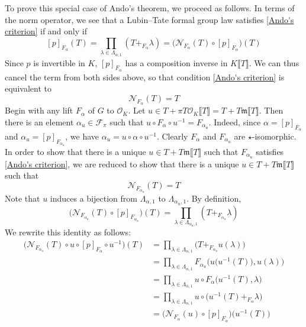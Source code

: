 \documentclass[12pt]{article}
\theoremstyle{definition}
\newcommand{\PS}[1]{\llbracket #1 \rrbracket}
\def\TF{\mathscr{F}}
\def\CN{\mathscr{N}}
\def\m{\mathfrak{m}}
\def\O{\mathcal{O}}
\begin{document}
    To prove this special case of Ando's theorem, we proceed as follows. In terms of the norm operator, we see that a Lubin--Tate formal group law satisfies \eqref{Ando's criterion} if and only if 
    \begin{equation} \label{Ando's condition in term of CN before canceling [p]_F}
        [p]_{F_\alpha}(T) = \prod_{\lambda \in \Lambda_{\alpha,1}} (T +_{F_\alpha} \lambda) = \bigl(\CN_{F_\alpha}(T) \circ [p]_{F_\alpha}\bigr)(T)
    \end{equation} 
    Since $p$ is invertible in $K$, $[p]_{F_\alpha}$ has a composition inverse in $K\PS{T}$. We can thus cancel the term from both sides above, so that condition \eqref{Ando's criterion} is equivalent to 
    \begin{equation} \label{Walker's conclusion}
        \CN_{F_\alpha}(T) = T
    \end{equation}
    Begin with any lift $F_\alpha$ of $G$ to $\O_K$. Let $u \in T + \pi T \O_K\PS{T} = T + T\m\PS{T}$. Then there is an element $\alpha_u \in \TF_\pi$ such that $u \circ F_\alpha \circ u^{-1} = F_{\alpha_u}$. Indeed, since $\alpha = [p]_{F_\alpha}$ and $\alpha_u = [p]_{F_{\alpha_u}}$, we have $\alpha_u = u \circ \alpha \circ u^{-1}$. Clearly $F_\alpha$ and $F_{\alpha_u}$ are $\star$-isomorphic. In order to show that there is a unique $u \in T + T\m\PS{T}$ such that $F_{\alpha_u}$ satisfies \eqref{Ando's criterion}, we are reduced to show that there is a unique $u \in T + T\m\PS{T}$ such that 
    \begin{equation} \label{condition for CN_F_alpha_u}
        \CN_{F_{\alpha_u}}(T) = T
    \end{equation}
    Note that $u$ induces a bijection from $\Lambda_{\alpha,1}$ to $\Lambda_{\alpha_u,1}$. By definition,  
    \begin{equation*}
        \bigl(\CN_{F_{\alpha_u}}(T) \circ [p]_{F_{\alpha_u}}\bigr)(T) = \prod_{\lambda \in \Lambda_{\alpha_u,1}} (T +_{F_
        {\alpha_u}} \lambda)
    \end{equation*}
    We rewrite this identity as follows:  
    \begin{align*}
        \bigl(\CN_{F_{\alpha_u}}(T) \circ u \circ [p]_{F_\alpha} \circ u^{-1}\bigr)(T) &= \prod_{\lambda \in \Lambda_{\alpha,1}} \bigl(T +_{F_{\alpha_u}} u(\lambda)\bigr) \\ 
        &= \prod_{\lambda \in \Lambda_{\alpha,1}} F_{\alpha_u}\biggl(u\bigl(u^{-1}(T)\bigr),u(\lambda)\biggr) \\ 
        &= \prod_{\lambda \in \Lambda_{\alpha,1}} u \circ F_\alpha\bigl(u^{-1}(T),\lambda\bigr) \\ 
        &= \prod_{\lambda \in \Lambda_{\alpha,1}} u \circ \bigl(u^{-1}(T) +_{F_\alpha} \lambda\bigr) \\ 
        &= \bigl(\CN_{F_\alpha}(u) \circ [p]_{F_\alpha}\bigr) \bigl(u^{-1}(T)\bigr)
    \end{align*}
\end{document}
